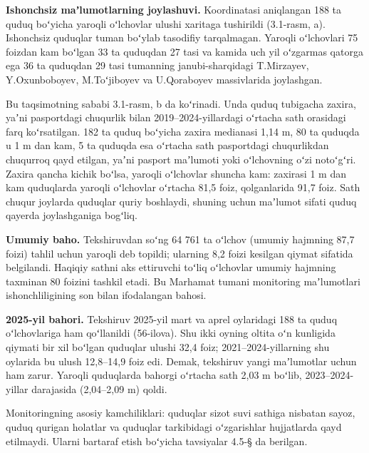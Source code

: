 \textbf{Ishonchsiz maʼlumotlarning joylashuvi.} Koordinatasi aniqlangan
188 ta quduq boʻyicha yaroqli oʻlchovlar ulushi xaritaga tushirildi
(3.1-rasm, a). Ishonchsiz quduqlar tuman boʻylab tasodifiy tarqalmagan.
Yaroqli oʻlchovlari 75 foizdan kam boʻlgan 33 ta quduqdan 27 tasi va
kamida uch yil oʻzgarmas qatorga ega 36 ta quduqdan 29 tasi tumanning
janubi-sharqidagi T.Mirzayev, Y.Oxunboboyev, M.Toʻjiboyev va U.Qoraboyev
massivlarida joylashgan.

Bu taqsimotning sababi 3.1-rasm, b da koʻrinadi. Unda quduq tubigacha
zaxira, yaʼni pasportdagi chuqurlik bilan 2019--2024-yillardagi oʻrtacha
sath orasidagi farq koʻrsatilgan. 182 ta quduq boʻyicha zaxira medianasi
1,14 m, 80 ta quduqda u 1 m dan kam, 5 ta quduqda esa oʻrtacha sath
pasportdagi chuqurlikdan chuqurroq qayd etilgan, yaʼni pasport maʼlumoti
yoki oʻlchovning oʻzi notoʻgʻri. Zaxira qancha kichik boʻlsa, yaroqli
oʻlchovlar shuncha kam: zaxirasi 1 m dan kam quduqlarda yaroqli
oʻlchovlar oʻrtacha 81,5 foiz, qolganlarida 91,7 foiz. Sath chuqur
joylarda quduqlar quriy boshlaydi, shuning uchun maʼlumot sifati quduq
qayerda joylashganiga bogʻliq.



\textbf{Umumiy baho.} Tekshiruvdan soʻng 64 761 ta oʻlchov (umumiy
hajmning 87,7 foizi) tahlil uchun yaroqli deb topildi; ularning 8,2
foizi kesilgan qiymat sifatida belgilandi. Haqiqiy sathni aks ettiruvchi
toʻliq oʻlchovlar umumiy hajmning taxminan 80 foizini tashkil etadi. Bu
Marhamat tumani monitoring maʼlumotlari ishonchliligining son bilan
ifodalangan bahosi.

\textbf{2025-yil bahori.} Tekshiruv 2025-yil mart va aprel oylaridagi
188 ta quduq oʻlchovlariga ham qoʻllanildi (56-ilova). Shu ikki oyning
oltita oʻn kunligida qiymati bir xil boʻlgan quduqlar ulushi 32,4 foiz;
2021--2024-yillarning shu oylarida bu ulush 12,8--14,9 foiz edi. Demak,
tekshiruv yangi maʼlumotlar uchun ham zarur. Yaroqli quduqlarda bahorgi
oʻrtacha sath 2,03 m boʻlib, 2023--2024-yillar darajasida (2,04--2,09 m)
qoldi.

Monitoringning asosiy kamchiliklari: quduqlar sizot suvi sathiga
nisbatan sayoz, quduq qurigan holatlar va quduqlar tarkibidagi
oʻzgarishlar hujjatlarda qayd etilmaydi. Ularni bartaraf etish boʻyicha
tavsiyalar 4.5-§ da berilgan.

